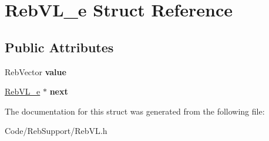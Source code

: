 \hypertarget{struct_reb_v_l__e}{}\section{Reb\+V\+L\+\_\+e Struct Reference}
\label{struct_reb_v_l__e}
\subsection*{Public Attributes}
\begin{DoxyCompactItemize}
\item 
Reb\+Vector {\bfseries value}\hypertarget{struct_reb_v_l__e_aa7f35ebe0ed7b028e1ae87a041b553c1}{}\label{struct_reb_v_l__e_aa7f35ebe0ed7b028e1ae87a041b553c1}

\item 
\hyperlink{struct_reb_v_l__e}{Reb\+V\+L\+\_\+e} $\ast$ {\bfseries next}\hypertarget{struct_reb_v_l__e_aba2685c2b0a267cb71866c780ca7c677}{}\label{struct_reb_v_l__e_aba2685c2b0a267cb71866c780ca7c677}

\end{DoxyCompactItemize}


The documentation for this struct was generated from the following file\+:\begin{DoxyCompactItemize}
\item 
Code/\+Reb\+Support/Reb\+V\+L.\+h\end{DoxyCompactItemize}
